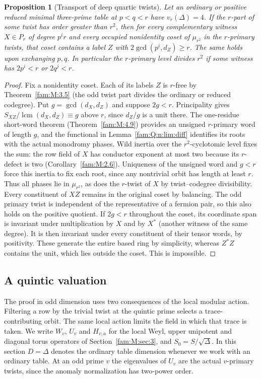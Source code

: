 \documentclass[11pt,a4paper]{article}
\numberwithin{equation}{section}
\newtheorem{proposition}[theorem]{Proposition}
\theoremstyle{remark}
\begin{document}
\begin{proposition}[Transport of deep quartic twists]\label{fam:Q:4.4}
Let an ordinary or positive reduced minimal three-prime table at $p<q<r$
have $v_r(\Delta)=4$. If the $r$-part of some twist has order greater
than $r^2$, then for every complementary witness $X\in P_r$ of
degree $p^i r$ and every occupied nonidentity coset of $\mu_{r^2}$
in the $r$-primary twists, that coset contains a label $Z$ with
$2\gcd(p^i,d_Z)\ge r$. The same holds upon exchanging $p,q$.
In particular the $r$-primary level divides $r^2$ if some witness has
$2p^i<r$ or $2q^j<r$.
\end{proposition}
\begin{proof}
Fix a nonidentity coset. Each of its labels $Z$ is $r$-free by
Theorem~\ref{fam:M:3.5} (the odd twist part divides the ordinary or
reduced codegree). Put $g=\gcd(d_X,d_Z)$ and suppose $2g<r$.
Principality gives $S_{XZ}/\operatorname{lcm}(d_X,d_Z)\equiv g$
above $r$, since $d_Z/g$ is a unit there. The one-residue short-word
theorem (Theorem~\ref{fam:M:4.9}) provides an unsigned $r$-primary word of length $g$, and the
functional in Lemma~\ref{fam:Q:n:lim:diff} identifies its roots with the actual monodromy
phases. Wild inertia over the $r^2$-cyclotomic level fixes the sum:
the row field of $X$ has conductor exponent at most two because its
$r$-defect is two (Corollary~\ref{fam:M:2.6}). Uniqueness of the unsigned word and $g<r$ force
this inertia to fix each root, since any nontrivial orbit has length
at least $r$. Thus all phases lie in $\mu_{r^2}$, as does the
$r$-twist of $X$ by twist--codegree divisibility. Every constituent of
$XZ$ remains in the original coset by balancing. The odd primary twist
is independent of the representative of a fermion pair, so this also
holds on the positive quotient. If $2g<r$ throughout the coset, its
coordinate span is invariant under multiplication by $X$ and by
$X^*$ (another witness of the same degree). It is then invariant under
every constituent of their tensor words, by positivity. These generate
the entire based ring by simplicity, whereas $Z^*Z$ contains the unit,
which lies outside the coset. This is impossible.
\end{proof}

\subsection{A quintic valuation}\label{fam:Q:sec:5}\label{fam:Q:n:q12:quintic-section}
The proof in odd dimension uses two consequences of the local modular
action. Filtering a row by the trivial twist at the quintic prime
selects a trace-contributing orbit. The same local action limits the
field in which that trace is taken. We write $W_v$, $U_v$ and
$H_{v,a}$ for the local Weyl, upper unipotent and diagonal torus
operators of Section~\ref{fam:M:sec:3}, and $S_0=S/\sqrt\Delta$. In this section $D=\Delta$ denotes the ordinary
table dimension whenever we work with an ordinary table.
At an odd prime $v$ the eigenvalues of $U_v$ are the actual
$v$-primary twists, since the anomaly normalization has two-power order.
\end{document}
